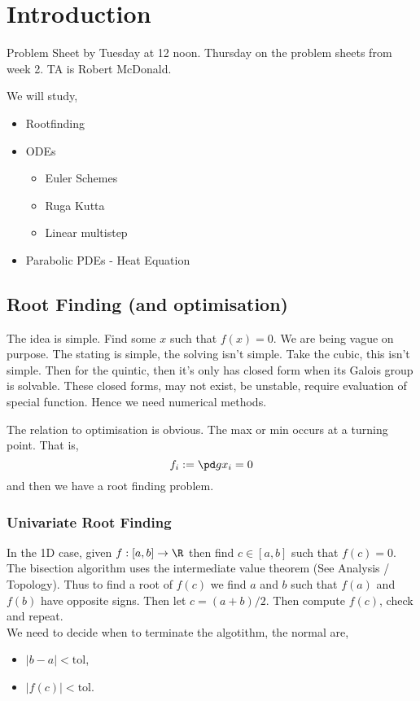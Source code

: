 
\section{Introduction}

Problem Sheet by Tuesday at 12 noon. Thursday on the problem sheets from week 2. TA is Robert McDonald.

\noindent
We will study,
\begin{itemize}
  \item Rootfinding
  \item ODEs
  \begin{itemize}
    \item Euler Schemes
    \item Ruga Kutta
    \item Linear multistep
  \end{itemize}
  \item Parabolic PDEs - Heat Equation
\end{itemize}

\subsection{Root Finding (and optimisation)}
The idea is simple. Find some $x$ such that $f(x) = 0$. We are being vague on purpose. The stating is simple, the solving isn't simple. Take the cubic, this isn't simple.
Then for the quintic, then it's only has closed form when its Galois group is solvable. These closed forms, may not exist, be unstable, require evaluation of special function. Hence we need numerical methods.

The relation to optimisation is obvious. The max or min occurs at a turning point. That is,
$$ f_i := \pd g {x_i} = 0 $$
and then we have a root finding problem.

\subsubsection{Univariate Root Finding}
In the 1D case, given $f: [a, b] \to \R$ then find $c \in [a, b]$ such that $f(c) =0$. The bisection algorithm uses the intermediate value theorem (See Analysis / Topology). Thus to find a root of $f(c)$ we find $a$ and $b$ such that $f(a)$ and $f(b)$ have opposite signs. Then let $c = (a + b)/2$. Then compute $f(c)$, check and repeat. \\

\noindent
We need to decide when to terminate the algotithm, the normal are,
\begin{itemize}
  \item $|b - a| < \mathrm{tol}$,
  \item $|f(c)| < \mathrm{tol}$.
\end{itemize}

